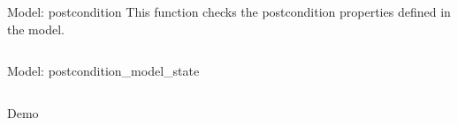 \begin{frame}
  \inputminted{erlang}{./code/next_model_state1.erl}
\end{frame}

\begin{frame}{Model: postcondition}
  This function checks the postcondition properties defined in the
  model.

  \inputminted{erlang}{./code/postcondition.erl}
\end{frame}

\begin{frame}{Model: postcondition\_model\_state}
  \inputminted{erlang}{./code/postcondition_model_state.erl}
\end{frame}

\begin{frame}[standout]
  Demo
\end{frame}